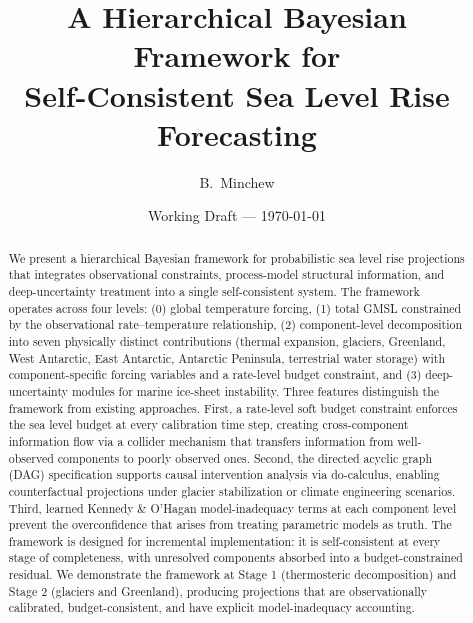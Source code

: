 \documentclass[11pt]{article}
\title{A Hierarchical Bayesian Framework for\\
  Self-Consistent Sea Level Rise Forecasting}
\author{B.\ Minchew}
\date{Working Draft --- \today}
\begin{document}
\maketitle


\begin{abstract}
We present a hierarchical Bayesian framework for probabilistic sea level rise projections that integrates observational constraints, process-model structural information, and deep-uncertainty treatment into a single self-consistent system.
The framework operates across four levels: (0) global temperature forcing, (1) total GMSL constrained by the observational rate--temperature relationship, (2) component-level decomposition into seven physically distinct contributions (thermal expansion, glaciers, Greenland, West Antarctic, East Antarctic, Antarctic Peninsula, terrestrial water storage) with component-specific forcing variables and a rate-level budget constraint, and (3) deep-uncertainty modules for marine ice-sheet instability.
Three features distinguish the framework from existing approaches.
First, a rate-level soft budget constraint enforces the sea level budget at every calibration time step, creating cross-component information flow via a collider mechanism that transfers information from well-observed components to poorly observed ones.
Second, the directed acyclic graph (DAG) specification supports causal intervention analysis via do-calculus, enabling counterfactual projections under glacier stabilization or climate engineering scenarios.
Third, learned Kennedy \& O'Hagan model-inadequacy terms at each component level prevent the overconfidence that arises from treating parametric models as truth.
The framework is designed for incremental implementation: it is self-consistent at every stage of completeness, with unresolved components absorbed into a budget-constrained residual.
We demonstrate the framework at Stage 1 (thermosteric decomposition) and Stage 2 (glaciers and Greenland), producing projections that are observationally calibrated, budget-consistent, and have explicit model-inadequacy accounting.
\end{abstract}


\end{document}

